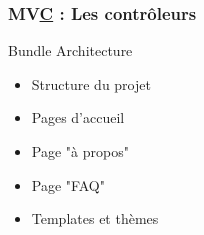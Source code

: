 
\begin{frame}
  \frametitle{MV\underline{C} : Les contrôleurs}
  \begin{block}{Bundle Architecture}
  \begin{itemize}
  \item Structure du projet	
  \item Pages d'accueil
  \item Page "à propos"
  \item Page "FAQ"
  \item Templates et thèmes
  \end{itemize}
  \end{block}   
  \end{frame}
